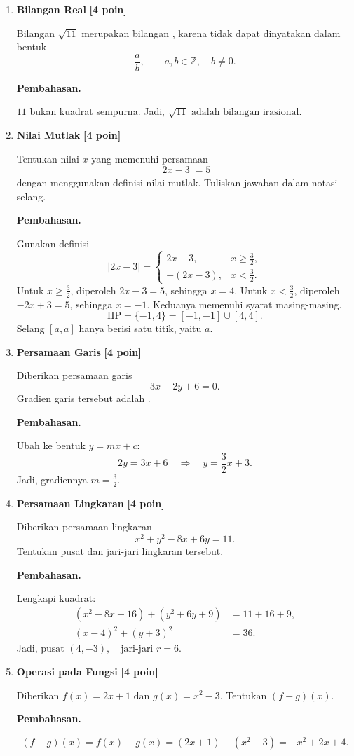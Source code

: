 \documentclass[12pt,a4paper]{article}
\newcommand{\pembahasan}{\par\medskip\textbf{Pembahasan.}\par\smallskip}
\newcommand{\poin}[1]{\hfill\textbf{[#1 poin]}}
\begin{document}
\begin{enumerate}
  \item \textbf{Bilangan Real} \poin{4}

    Bilangan $\sqrt{11}$ merupakan bilangan \underline{\hspace{3cm}},
    karena tidak dapat dinyatakan dalam bentuk
    \[
      \frac{a}{b},\qquad a,b\in\mathbb{Z},\quad b\ne 0.
    \]

    \pembahasan
    $11$ bukan kuadrat sempurna. Jadi, $\boxed{\sqrt{11}\text{ adalah bilangan irasional}}$.

  \item \textbf{Nilai Mutlak} \poin{4}

    Tentukan nilai $x$ yang memenuhi persamaan
    \[
      |2x-3|=5
    \]
    dengan menggunakan definisi nilai mutlak.
    Tuliskan jawaban dalam notasi selang.

    \pembahasan
    Gunakan definisi
    \[
      |2x-3|=
      \begin{cases}
        2x-3, & x\ge \frac32,\\
        -(2x-3), & x<\frac32.
      \end{cases}
    \]
    Untuk $x\ge\frac32$, diperoleh $2x-3=5$, sehingga $x=4$.
    Untuk $x<\frac32$, diperoleh $-2x+3=5$, sehingga $x=-1$.
    Keduanya memenuhi syarat masing-masing.
    \[
      \boxed{\mathrm{HP}=\{-1,4\}=[-1,-1]\cup[4,4]}.
    \]
    Selang $[a,a]$ hanya berisi satu titik, yaitu $a$.

  \item \textbf{Persamaan Garis} \poin{4}

    Diberikan persamaan garis
    \[
      3x-2y+6=0.
    \]
    Gradien garis tersebut adalah \underline{\hspace{3cm}}.

    \pembahasan
    Ubah ke bentuk $y=mx+c$:
    \[
      2y=3x+6\quad\Longrightarrow\quad y=\frac32x+3.
    \]
    Jadi, gradiennya $\boxed{m=\frac32}$.

  \item \textbf{Persamaan Lingkaran} \poin{4}

    Diberikan persamaan lingkaran
    \[
      x^2+y^2-8x+6y=11.
    \]
    Tentukan pusat dan jari-jari lingkaran tersebut.

    \pembahasan
    Lengkapi kuadrat:
    \begin{align*}
      (x^2-8x+16)+(y^2+6y+9)&=11+16+9,\\
      (x-4)^2+(y+3)^2&=36.
    \end{align*}
    Jadi, $\boxed{\text{pusat }(4,-3),\quad\text{jari-jari }r=6}$.

  \item \textbf{Operasi pada Fungsi} \poin{4}

    Diberikan $f(x)=2x+1$ dan $g(x)=x^2-3$.
    Tentukan $(f-g)(x)$.

    \pembahasan
    \[
      (f-g)(x)=f(x)-g(x)=(2x+1)-(x^2-3)
      =\boxed{-x^2+2x+4}.
    \]
\end{enumerate}
\end{document}
